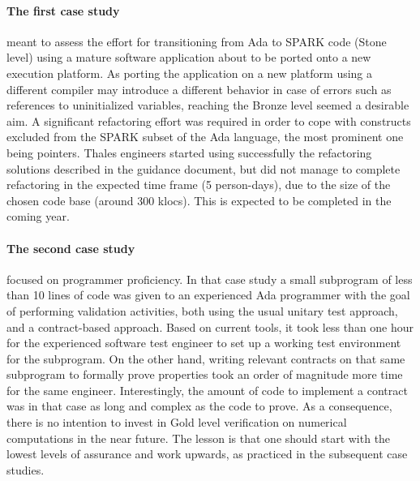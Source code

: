 \documentclass{llncs}
\begin{document}
\paragraph{The first case study} meant to assess the effort for transitioning from Ada to
SPARK code (Stone level) using a mature software application about to be ported
onto a new execution platform. As porting the application on a new platform
using a different compiler may introduce a different behavior in case of errors
such as references to uninitialized variables, reaching the Bronze level seemed
a desirable aim. A significant refactoring effort was required in order to cope
with constructs excluded from the SPARK subset of the Ada language, the most
prominent one being pointers. Thales engineers started using successfully the
refactoring solutions described in the guidance document, but did not manage to
complete refactoring in the expected time frame (5 person-days), due to the
size of the chosen code base (around 300 klocs). This is expected to be
completed in the coming year.

\paragraph{The second case study} focused on programmer proficiency. In that case study a small
subprogram of less than 10 lines of code was given to an experienced Ada
programmer with the goal of performing validation activities, both using the
usual unitary test approach, and a contract-based approach. Based on current
tools, it took less than one hour for the experienced software test engineer to
set up a working test environment for the subprogram. On the other hand,
writing relevant contracts on that same subprogram to formally prove properties
took an order of magnitude more time for the same engineer. Interestingly, the
amount of code to implement a contract was in that case as long and complex as
the code to prove. As a consequence, there is no
intention to invest in Gold level verification on numerical computations in the
near future. The lesson is that one should start with the lowest levels of
assurance and work upwards, as practiced in the subsequent case studies.
\end{document}
